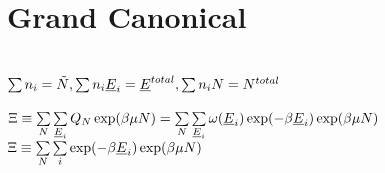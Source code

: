 \section{Grand Canonical}
\begin{mdframed}
    \vspace*{\baselineskip}
    \\

     $\sum\nolimits n_{i} = \tilde{\nummoles}, \sum\nolimits n_{i}\uline{\energy}_{i} = \uline{\energy}^{total},\sum\nolimits n_{i}\nummoles = \nummoles^{total}  $\\     %
    
     \\
    $\gcpf \equiv \sum\limits_{\nummoles}\sum\limits_{\uline{\energy}_{i}} \cpf\exp(\boltznorm\chempot\nummoles) = \sum\limits_{\nummoles}\sum\limits_{\uline{\energy}_{i}} \mpf(\uline{\energy}_{i})\exp(-\boltznorm\uline{\energy}_{i})\exp(\boltznorm\chempot\nummoles) $\\
    
    $\gcpf \equiv \sum\limits_{\nummoles}\sum\limits_{i} \exp(-\boltznorm\uline{\energy}_{i})\exp(\boltznorm\chempot\nummoles) $ \\
           
     \\
    
\end{mdframed}